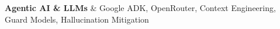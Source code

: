 \textbf{Agentic AI \& LLMs} & Google ADK, OpenRouter, Context Engineering, Guard Models, Hallucination Mitigation \\
